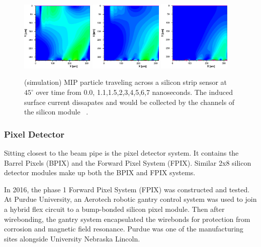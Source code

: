 \begin{figure}[ht!b]
  \includegraphics[width=0.31\textwidth]{figures/silicon/silicon_t5.0.png}
  \includegraphics[width=0.31\textwidth]{figures/silicon/silicon_t6.0.png}
  \includegraphics[width=0.31\textwidth]{figures/silicon/silicon_t7.0.png}\\
    \caption{\label{fig:sd} (simulation) MIP particle traveling across a silicon strip sensor at $45^\circ$ over time from 0.0, 1.1,1.5,2,3,4,5,6,7 nanoseconds. The induced surface current dissapates and would be collected by the channels of the silicon module ~\cite{Eichhorn:2112017}.}
\end{figure}





\subsubsection{Pixel Detector}
\label{sec:pixeldet}
Sitting closest to the beam pipe is the pixel detector system. It contains the Barrel Pixels (BPIX) and the Forward Pixel System (FPIX).  
Similar 2x8 silicon detector modules make up both the BPIX and FPIX systems.

In 2016, the phase 1 Forward Pixel System (FPIX) was constructed and tested. At Purdue University, an Aerotech robotic gantry control system was used to join a hybrid flex circuit to a bump-bonded silicon pixel module. Then after wirebonding, the gantry system encapsulated the wirebonds for protection from corrosion and magnetic field resonance. Purdue was one of the manufacturing sites alongside University Nebraska Lincoln. 

